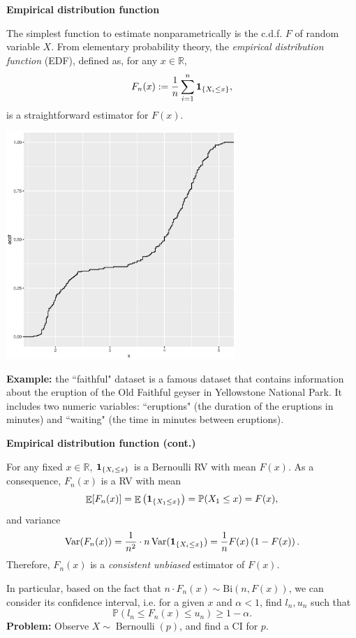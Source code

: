 \documentclass[19pt,landscaoe]{article}
\newcommand{\IP}{\mathbb{P}}
\newcommand{\bone}{{\bf 1}}
\DeclareMathOperator{\E}{\mathbb{E}}
\newcommand{\R}{\mathbb{R}}
\DeclareMathOperator{\Var}{\mathrm{Var}}
\begin{document}
\newpage
{\LARGE\centerline{\textbf{Empirical distribution function}}}
\vskip25pt
    \Large The simplest function to estimate nonparametrically is the c.d.f. $F$ of random variable $X$. 
From elementary probability theory, the {\it empirical distribution function} (EDF), defined as, for any $x\in\R$, 
\begin{equation}
    F_n(x):=\frac1n\sum_{i=1}^n\bone_{\{X_i\le x\}},
\end{equation}
is a straightforward estimator for $F(x)$. 
\vskip 5pt
\begin{center}
\includegraphics[width=0.65\textwidth,height=0.4\textwidth]{eruptions.eps}
\end{center}
{\bf Example:} the ``faithful" dataset is a famous dataset that contains information about the eruption of the Old Faithful geyser in Yellowstone National Park. It includes two numeric variables: ``eruptions" (the duration of the eruptions in minutes) and ``waiting" (the time in minutes between eruptions).
\newpage
{\LARGE\centerline{\textbf{Empirical distribution function (cont.)}}}
\vskip25pt
\begin{minipage}{.9\textwidth}
    \large 
For any fixed $x\in\R$, $\bone_{\{X_i\le x\}}$ is a Bernoulli RV with mean $F(x)$. As a consequence, $F_n(x)$ is a RV with mean 
\begin{equation*}
    \E[F_n(x)]=\E\left(\bone_{\{X_1\le x\}}\right)=\IP(X_1\le x)=F(x),
\end{equation*}
and variance 
\begin{equation*}
    \Var(F_n(x))=\frac1{n^2}\cdot n\Var(\bone_{\{X_i\le x\}})=\frac1nF(x)\left(1-F(x)\right).
\end{equation*}
Therefore, $F_n(x)$ is a {\it consistent unbiased} estimator of $F(x)$. 

    \vskip 5pt
    In particular, based on the fact that $n\cdot F_n(x)\sim {}(n,F(x))$, we can consider its confidence interval, i.e. for a  given $x$ and $\alpha<1$, find $l_n, u_n$ such that
    $$
    \IP\left(l_n \leq F_n(x) \leq u_n\right) \geq 1-\alpha.
    $$
    {\bf Problem:} Observe $X \sim {}(p)$, and find a $$ for $p$.
\end{minipage}
\end{document}
